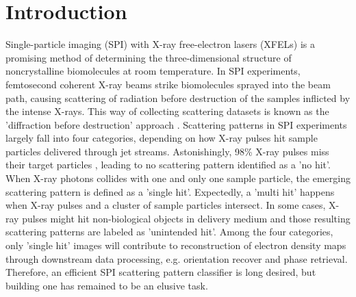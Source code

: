 \section{Introduction}


Single-particle imaging (SPI) with X-ray free-electron lasers (XFELs) is a
promising method of determining the three-dimensional structure of
noncrystalline biomolecules at room temperature.   In SPI experiments,
femtosecond coherent X-ray beams strike biomolecules sprayed into the beam path,
causing scattering of radiation before destruction of the samples inflicted by
the intense X-rays.  This way of collecting scattering datasets is known as the
'diffraction before destruction' approach
\cite{neutzePotentialBiomolecularImaging2000,
chapmanFemtosecondDiffractiveImaging2006,seibertSingleMimivirusParticles2011,
aquilaLinacCoherentLight2015,reddyCoherentSoftXray2017}.  Scattering patterns in
SPI experiments largely fall into four categories, depending on how X-ray pulses
hit sample particles delivered through jet streams.  Astonishingly, 98\% X-ray
pulses miss their target particles
\cite{shiEvaluationPerformanceClassification2019}, leading to no scattering
pattern identified as a 'no hit'.  When X-ray photons collides with one and only
one sample particle, the emerging scattering pattern is defined as a 'single
hit'. Expectedly, a 'multi hit' happens when X-ray pulses and a cluster of
sample particles intersect. In some cases, X-ray pulses might hit non-biological
objects in delivery medium and those resulting scattering patterns are labeled
as 'unintended hit'.  Among the four categories, only 'single hit' images will
contribute to reconstruction of electron density maps through downstream data
processing, e.g. orientation recover and phase retrieval.  Therefore, an
efficient SPI scattering pattern classifier is long desired, but building one
has remained to be an elusive task.


% 

